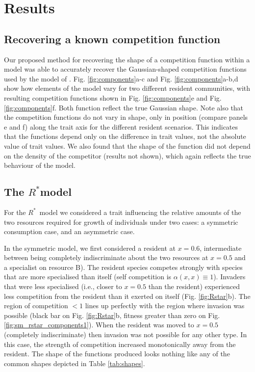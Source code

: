 \documentclass[a4paper,11pt]{article}
\newcommand{\Rstar}{\ensuremath{R^*}}
\begin{document}
\section{Results}

\subsection{Recovering a known competition function}

Our proposed method for recovering the shape of a competition function within a model was able to accurately recover the Gaussian-shaped competition functions used by the model of \citet{Dieckmann-1999}. Fig. \ref{fig:components}a-c and Fig. \ref{fig:components}a-b,d show how elements of the model vary for two different resident communities, with resulting competition functions shown in Fig. \ref{fig:components}e and Fig. \ref{fig:components}f. Both function reflect the true Gaussian shape. Note also that the competition functions do not vary in shape, only in position (compare panels e and f) along the trait axis for the different resident scenarios. This indicates that the functions depend only on the difference in trait values, not the absolute value of trait values. We also found that the shape of the function did not depend on the density of the competitor (results not shown), which again reflects the true behaviour of the model.

\subsection{The \Rstar model}

For the \Rstar\ model we considered a trait influencing the relative amounts of the two resources required for growth of individuals under two cases: a symmetric consumption case, and an asymmetric case.

In the symmetric model, we first considered a resident at $x = 0.6$, intermediate between being completely indiscriminate about the two resources at $x = 0.5$ and a specialist on resource B). The resident species competes strongly with species that are more specialised than itself (self competition is $\alpha(x, x) \equiv 1$). Invaders that were less specialised (i.e., closer to $x = 0.5$ than the resident) experienced less competition from the resident than it exerted on itself (Fig. \ref{fig:Rstar}b). The region of competition $< 1$ lines up perfectly with the region where invasion was possible (black bar on Fig. \ref{fig:Rstar}b, fitness greater than zero on Fig. \ref{fig:sm_rstar_components1}). When the resident was moved to $x = 0.5$ (completely indiscriminate) then invasion was not possible for any other type.  In this case, the strength of competition increased monotonically away from the resident. The shape of the functions produced looks nothing like any of the common shapes depicted in Table \ref{tab:shapes}.
\end{document}
